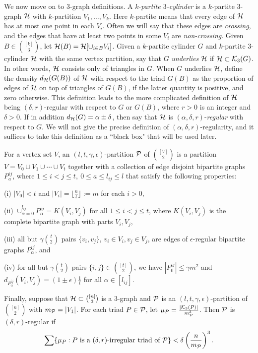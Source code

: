 \documentclass[11pt]{article}
\begin{document}
We now move on to $3$-graph definitions. A $k$-{\it partite
$3$-cylinder} is a $k$-partite $3$-graph ${\cal H}$ with $k$-partition
$V_1, \ldots, V_k$. Here $k$-partite means that every edge of ${\cal H}$
has at most one point in each $V_i$.  Often we will say that these
edges are {\it crossing}, and the edges that have at least two
points in some $V_i$ are {\it non-crossing}. Given $B \in
\binom{[k]}{3}$, let ${\cal H}(B)={\cal H}[\cup_{i \in B}V_i]$. Given a
$k$-partite cylinder $G$ and $k$-partite $3$-cylinder ${\cal H}$ with the
same vertex partition, say that $G$ {\it underlies} ${\cal H}$ if ${\cal H}
\subset {\cal K}_3(G)$.  In other words, ${\cal H}$ consists  only of
triangles in $G$. When $G$ underlies ${\cal H}$, define the density
$d_{{\cal H}}(G(B))$ of ${\cal H}$ with respect to the triad $G(B)$ as the
proportion of edges of ${\cal H}$ on top of triangles of $G(B)$, if the
latter quantity is positive, and zero otherwise. This definition
leads to the more complicated definition of ${\cal H}$ being $(\delta,
r)$-regular with respect to $G$ or $G(B)$, where $r>0$ is an integer
and $\delta>0$. If in addition $d_{{\cal H}}(G)=\alpha \pm \delta$, then
say that ${\cal H}$ is $(\alpha, \delta, r)$-{\it regular} with respect
to $G$. We will not give the precise definition of $(\alpha, \delta,
r)$-regularity, and it suffices to take this definition as a ``black
box" that will be used later.

For a vertex set $V$, an $(l, t, \gamma, \epsilon)$-partition
 ${\cal P}$ of $\binom{[V]}{2}$ is a partition $V=V_0 \cup V_1 \cup \cdots \cup V_t$
together with a collection of edge disjoint bipartite graphs $P_{a}^{ij}$,
 where $1\le i<j\le t,\  0\le a\le l_{ij} \le l$ that satisfy the following properties:

(i) $|V_0|<t$ and $|V_i|=\lfloor \frac{n}{t} \rfloor:=m$ for each
$i>0$,

(ii) $\cup_{\alpha=0}^{l_{ij}}P_{\alpha}^{ij}=K(V_i, V_j)$ for all
$1\le i<j\le t$, where $K(V_i, V_j)$ is the complete bipartite graph
with parts $V_i, V_j$,

(iii) all but $\gamma{t \choose 2}$ pairs $\{v_i, v_j\}$, $v_i \in V_i, v_j \in V_j$,
are edges of $\epsilon$-regular bipartite graphs $P_{\alpha}^{ij}$, and

(iv) for all but $\gamma{t \choose 2}$ pairs $\{i,j\} \in
\binom{[t]}{2}$, we have $|P_0^{ij}|\le \gamma m^2$ and $d_{
P_{\alpha}^{ij} }(V_i, V_j)=(1\pm \epsilon)\frac{1}{l}$ for all
$\alpha \in [l_{ij}]$.

Finally, suppose that ${\cal H} \subset \binom{[n]}{3}$ is a $3$-graph
and ${\cal P}$ is an $(l, t, \gamma, \epsilon)$-partition of
$\binom{[n]}{2}$ with $m_{{\cal P}}=|V_1|$. For each triad $P \in {\cal P}$,
let $\mu_P=\frac{|{\cal K}_3(P)|}{m_{{\cal P}}^3}$. Then ${\cal P}$ is $(\delta,
r)$-regular if
$$\sum\{\mu_P: \hbox{$P$ is a $(\delta, r)$-irregular triad of ${\cal P}$}\} <\delta\left(\frac{n}{m_{{\cal P}}}\right)^3.$$
\end{document}
